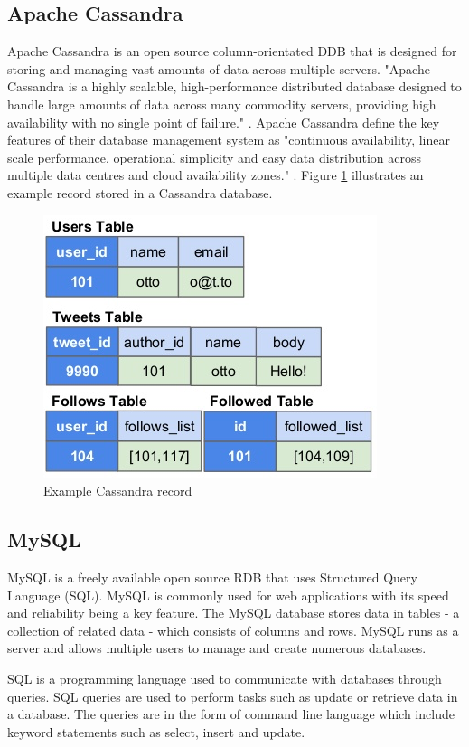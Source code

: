 \subsection{Apache Cassandra}\label{cassandra}
Apache Cassandra is an open source column-orientated DDB that is designed for storing and managing vast amounts of data across multiple servers. "Apache Cassandra is a highly scalable, high-performance distributed database designed to handle large amounts of data across many commodity servers, providing high availability with no single point of failure." \cite{cassandra}. Apache Cassandra define the key features of their database management system as "continuous availability, linear scale performance, operational simplicity and easy data distribution across multiple data centres and cloud availability zones." \cite{cassandra}.  Figure \ref{fig:cass} illustrates an example record stored in a Cassandra database. \begin{figure}[h]\begin{center}\includegraphics[width=0.70\linewidth]{images/cassandramodel}\caption{Example Cassandra record}\label{fig:cass}\end{center}\end{figure}

\subsection{MySQL}\label{mysql}
MySQL is a freely available open source RDB that uses Structured Query Language (SQL). MySQL is commonly used for web applications with its speed and reliability being a key feature. The MySQL database stores data in tables - a collection of related data - which consists of columns and rows. MySQL runs as a server and allows multiple users to manage and create numerous databases. 

SQL is a programming language used to communicate with databases through queries. SQL queries are used to perform tasks such as update or retrieve data in a database. The queries are in the form of command line language which include keyword statements such as select, insert and update.






